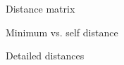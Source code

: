 \documentclass[aspectratio=169,12pt,t]{beamer}
\begin{document}
\begin{frame}[c]{Distance matrix}


\note{
}

\end{frame}



\begin{frame}[c]{Minimum vs. self distance}


\note{
}

\end{frame}



\begin{frame}[c]{Detailed distances}


\note{
}

\end{frame}
\end{document}
